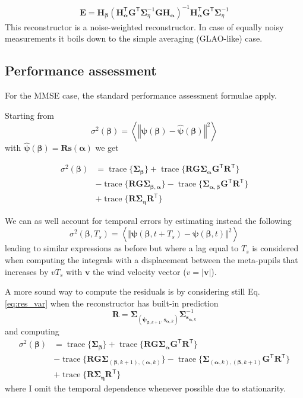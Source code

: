 \documentclass[a4paper,12pt]{article}
\newcommand{\average}[1]{\left \langle {#1} \right \rangle}
\newcommand{\T}{\mathsf{T}} %
\newcommand{\0}{\mathsf{0}} %
\newcommand{\Proj}{\mathbf{H}} %
\newcommand{\Rec}{\mathbf{R}} %
\newcommand{\Emv}{\mathbf{E}} %
\newcommand{\CovMat}{\boldsymbol{\Sigma}} %
\newcommand{\D}{\mathbf{G}} %
\newcommand{\tr}{\operatorname{trace}} %
\newcommand{\alphavec}{{\boldsymbol{\alpha}}}
\newcommand{\betavec}{{\boldsymbol{\beta}}}
\newcommand{\etavec}{{\boldsymbol{\eta}}}
\newcommand{\phivec}{{\boldsymbol{\psi}}}
\newcommand{\svec}{{\mathbf{s}}}
\newcommand{\Proj}{\mathbf{P}} %
\begin{document}
\begin{align}
\Emv = \Proj_\betavec\left(\Proj_\alphavec^\T\D^\T\CovMat_\eta^{-1} \D \Proj_\alphavec\right)^{-1}\Proj_\alphavec^\T\D^\T\CovMat_\eta^{-1}
\end{align}
This reconstructor is a noise-weighted reconstructor. In case of
equally noisy measurements it boils down to the simple averaging
(GLAO-like) case. 



\subsection{Performance assessment}

For the MMSE case, the standard performance assessment formulae
apply. 

Starting from
\begin{equation}\label{eq:res_var}
\sigma^2(\betavec) = \average{\left\Vert \phivec(\betavec) - \widehat{\phivec}(\betavec)\right\Vert^2}
\end{equation}
with $\widehat{\phivec}(\betavec) = \Rec  {\svec}(\alphavec)$ we get

\begin{align}\label{eq:res_var}
\sigma^2(\betavec) & = \tr\{\CovMat_\betavec\} +
\tr\{\Rec\D\CovMat_\alphavec\D^\T\Rec^\T\}  \\ & -
\tr\{\Rec\D\CovMat_{\betavec,\alphavec}\}  -
\tr\{\CovMat_{\alphavec, \betavec}\D^\T\Rec^\T\}  \\ & + \tr\{\Rec\CovMat_\etavec\Rec^\T\} 
\end{align}

We can as well account for temporal errors by estimating instead the
following 
\begin{equation}\label{eq:res_var_time}
\sigma^2(\betavec, T_s) = \average{\Vert \phivec(\betavec,t+T_s) - \phivec(\betavec,t)\Vert^2}
\end{equation}
leading to similar expressions as before but where a lag equal to
$T_s$ is considered when computing the integrals with a displacement
between the meta-pupils that increases by ${v}T_s$ with
$\mathbf{v}$ the wind velocity vector ($v = |\mathbf{v}|$).

A more sound way to compute the residuals is by considering still
Eq. \eqref{eq:res_var} when the reconstructor has built-in prediction 
\begin{equation}\label{eq:res_var_time}
\Rec =
\CovMat_{(\phivec_{\betavec,k+1},\svec_{\alphavec,k})}\CovMat^{-1}_{\svec_{\alphavec,
k} }
\end{equation}
and computing 
\begin{align}\label{eq:res_var}
\sigma^2(\betavec) & = \tr\{\CovMat_\betavec\} +
\tr\{\Rec\D\CovMat_\alphavec\D^\T\Rec^\T\} \\ & -
\tr\{\Rec\D\CovMat_{(\betavec,k+1),(\alphavec,k)}\}  -
\tr\{\CovMat_{(\alphavec,k), (\betavec,k+1)}\D^\T\Rec^\T\}  \\ & + \tr\{\Rec\CovMat_\etavec\Rec^\T\} 
\end{align}
where I omit the temporal dependence whenever possible due to stationarity.
\end{document}
